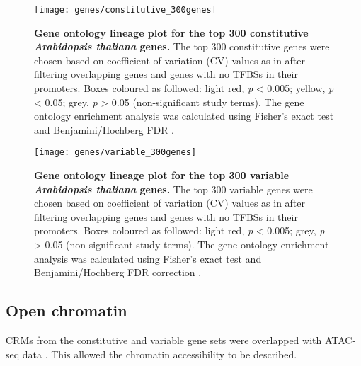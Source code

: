 \documentclass[../main.tex]{subfiles}
\begin{document}
\begin{figure}[hbt!]
	\begin{center}
		\capstart
		\texttt{[image: genes/constitutive\_300genes]}
		\caption{
			\textbf{Gene ontology lineage plot for the top 300 constitutive \textit{Arabidopsis thaliana} genes.}
			The top 300 constitutive genes were chosen based on coefficient of variation (CV) values as in \textcite{czechowskiGenomeWideIdentificationTesting2005} after filtering overlapping genes and genes with no TFBSs in their promoters.
			Boxes coloured as followed: light red, \textit{p} \textless{} 0.005; yellow, \textit{p} \textless{} 0.05; grey, \textit{p} \textgreater{} 0.05 (non-significant study terms).
			The gene ontology enrichment analysis was calculated using Fisher's exact test \autocite{fisherInterpretationContingencyTables1922} and Benjamini/Hochberg FDR \autocite{benjaminiControllingFalseDiscovery1995}.
			\label{fig:go-constitutive}
		}
		
	\end{center}
\end{figure}

\begin{figure}[hbt!]
	\begin{center}
		\capstart
		\texttt{[image: genes/variable\_300genes]}
		\caption{
			\textbf{Gene ontology lineage plot for the top 300 variable \textit{Arabidopsis thaliana} genes.}
			The top 300 variable genes were chosen based on coefficient of variation (CV) values as in \textcite{czechowskiGenomeWideIdentificationTesting2005} after filtering overlapping genes and genes with no TFBSs in their promoters.
			Boxes coloured as followed: light red, \textit{p} \textless{} 0.005; grey, \textit{p} \textgreater{} 0.05 (non-significant study terms).
			The gene ontology enrichment analysis was calculated using Fisher's exact test \autocite{fisherInterpretationContingencyTables1922} and Benjamini/Hochberg FDR correction \autocite{benjaminiControllingFalseDiscovery1995}.
			\label{fig:go-variable}
		}
		
	\end{center}
\end{figure}


\subsection{Open chromatin}
CRMs from the constitutive and variable gene sets were overlapped with ATAC-seq data \autocite{potterCytokininModulatesContextdependent2018}. This allowed the chromatin accessibility to be described.
\end{document}
